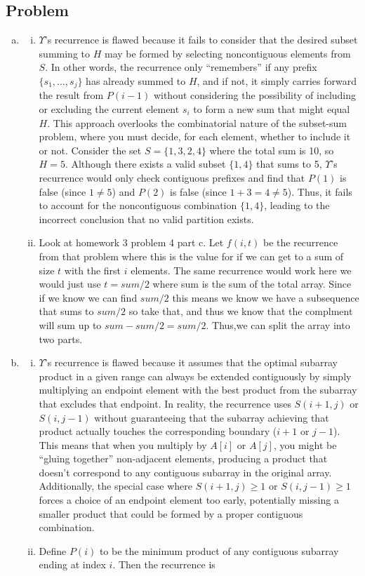 \documentclass[12pt, letterpaper]{article}
\theoremstyle{definition}
\newcounter{problem}
\newcommand{\q}{
    \newpage %
    \stepcounter{problem} %
    \subsection*{Problem \arabic{problem}} %
}
\begin{document}
\q
\begin{enumerate}[(a)]
    \item \begin{enumerate}[(i)]
        \item $\varUpsilon$'s recurrence is flawed because it fails to consider that the desired subset summing to \(H\) may be formed by selecting noncontiguous elements from \(S\). In other words, the recurrence only “remembers” if any prefix \(\{s_1,\dots,s_j\}\) has already summed to \(H\), and if not, it simply carries forward the result from \(P(i-1)\) without considering the possibility of including or excluding the current element \(s_i\) to form a new sum that might equal \(H\). This approach overlooks the combinatorial nature of the subset-sum problem, where you must decide, for each element, whether to include it or not.
        Consider the set \(S = \{1, 3, 2, 4\}\) where the total sum is 10, so \(H = 5\). Although there exists a valid subset \(\{1, 4\}\) that sums to 5, $\varUpsilon$'s recurrence would only check contiguous prefixes and find that \(P(1)\) is false (since \(1 \neq 5\)) and \(P(2)\) is false (since \(1+3=4 \neq 5\)). Thus, it fails to account for the noncontiguous combination \(\{1, 4\}\), leading to the incorrect conclusion that no valid partition exists.
        \item Look at homework 3 problem 4 part c. Let $f(i,t)$ be the recurrence from that problem where this is the value for if we can get to a sum of size $t$ with the first $i$ elements. The same recurrence would work here we would just use $t=sum/2$ where sum is the sum of the total array. Since if we know we can find $sum/2$ this means we know we have a subsequence that sums to $sum/2$ so take that, and thus we know that the complment will sum up to $sum-sum/2=sum/2$. Thus,we can split the array into two parts.
    \end{enumerate}
    \item \begin{enumerate}[(i)]
        \item $\varUpsilon$'s recurrence is flawed because it assumes that the optimal subarray product in a given range can always be extended contiguously by simply multiplying an endpoint element with the best product from the subarray that excludes that endpoint. In reality, the recurrence uses $S(i+1, j)$ or $S(i, j-1)$ without guaranteeing that the subarray achieving that product actually touches the corresponding boundary ($i+1$ or $j-1$). This means that when you multiply by $A[i]$ or $A[j]$, you might be “gluing together” non-adjacent elements, producing a product that doesn't correspond to any contiguous subarray in the original array. Additionally, the special case where $S(i+1, j) \geq 1$ or $S(i, j-1)  \geq 1$ forces a choice of an endpoint element too early, potentially missing a smaller product that could be formed by a proper contiguous combination.
        \item Define \(P(i)\) to be the minimum product of any contiguous subarray ending at index \(i\). Then the recurrence is


\end{enumerate}
\end{enumerate}
\end{document}
